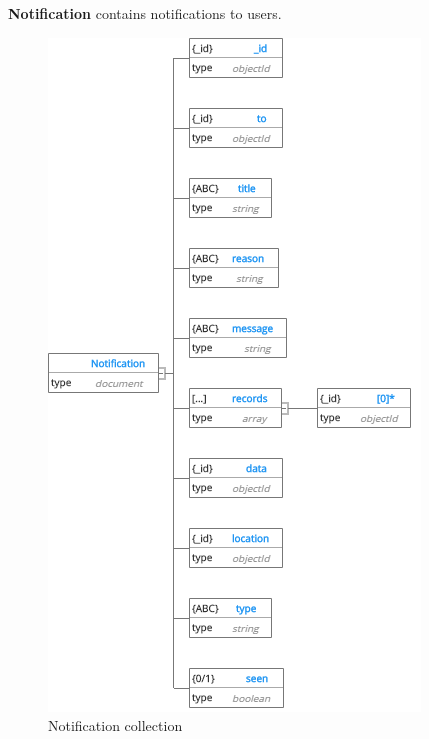 \textbf{Notification} contains notifications to users. 
\begin{center}
	\begin{figure}[H]
		\centering
		\includegraphics[width=0.6\columnwidth]{images/chap4/Notification.png}
		\caption{Notification collection}
	\end{figure}
\end{center}
\cleardoublepage

